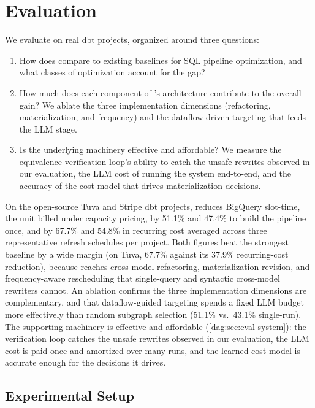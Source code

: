 \section{Evaluation}
\label{dag:sec:eval}

We evaluate \dagsmith{} on real dbt projects, organized around three questions:
\begin{enumerate}
    \item How does \dagsmith{} compare to existing baselines for SQL pipeline optimization, and what classes of optimization account for the gap?
    \item How much does each component of \dagsmith{}'s architecture contribute to the overall gain? We ablate the three  implementation dimensions  (refactoring, materialization, and frequency) and the dataflow-driven targeting that feeds the LLM stage.
    \item Is the underlying machinery effective and affordable? We measure the equivalence-verification loop's ability to catch the unsafe rewrites observed in our evaluation, the LLM cost of running the system end-to-end, and the accuracy of the cost model that drives materialization decisions.
\end{enumerate}

On the open-source Tuva and Stripe dbt projects, \dagsmith{} reduces BigQuery slot-time, the unit billed under capacity pricing, by 51.1\% and 47.4\% to build the pipeline once, and by 67.7\% and 54.8\% in recurring cost averaged across three representative refresh schedules per project. Both figures beat the strongest baseline by a wide margin (on Tuva, 67.7\% against its 37.9\% recurring-cost reduction), because \dagsmith{} reaches cross-model refactoring, materialization revision, and frequency-aware rescheduling that single-query and syntactic cross-model rewriters cannot. An ablation confirms the three  implementation dimensions are complementary, and that dataflow-guided targeting spends a fixed LLM budget more effectively than random subgraph selection (51.1\% vs.\ 43.1\% single-run). 
The supporting machinery is effective and affordable (\cref{dag:sec:eval-system}): the verification loop catches the unsafe rewrites observed in our evaluation, the LLM cost is paid once and amortized over many runs, and the learned cost model is accurate enough for the decisions it drives.




\subsection{Experimental Setup}
\label{dag:sec:eval-setup}




